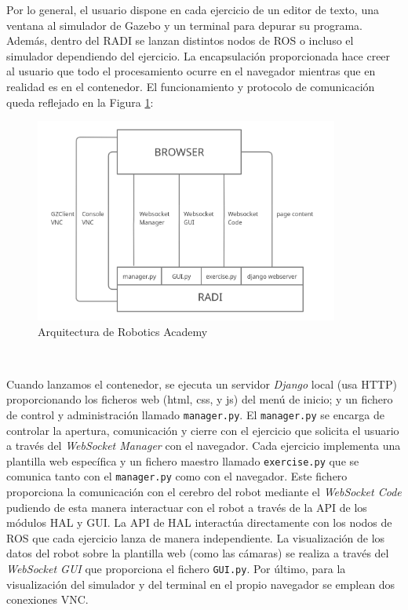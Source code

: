 Por lo general, el usuario dispone en cada ejercicio de un editor de texto, una ventana al simulador de Gazebo y un terminal para depurar su programa. Además, dentro del RADI se lanzan distintos nodos de ROS o incluso el simulador dependiendo del ejercicio. La encapsulación proporcionada hace creer al usuario que todo el procesamiento ocurre en el navegador mientras que en realidad es en el contenedor. El funcionamiento y protocolo de comunicación queda reflejado en la Figura \ref{fig:arquitectura_robotics_academy}:\\

\begin{figure} [H]
  \begin{center}
    \includegraphics[width=10cm]{imagenes/cap3/robotics_academy_architecture.png}
  \end{center}
  \caption{Arquitectura de Robotics Academy}
  \label{fig:arquitectura_robotics_academy}
\end{figure}\

Cuando lanzamos el contenedor, se ejecuta un servidor \textit{Django} local (usa HTTP) proporcionando los ficheros web (html, css, y js) del menú de inicio; y un fichero de control y administración llamado \texttt{manager.py}. El \texttt{manager.py} se encarga de controlar la apertura, comunicación y cierre con el ejercicio que solicita el usuario a través del \textit{WebSocket Manager} con el navegador. Cada ejercicio implementa una plantilla web específica y un fichero maestro llamado \texttt{exercise.py} que se comunica tanto con el \texttt{manager.py} como con el navegador. Este fichero proporciona la comunicación con el cerebro del robot mediante el \textit{WebSocket Code} pudiendo de esta manera interactuar con el robot a través de la API de los módulos HAL y GUI. La API de HAL interactúa directamente con los nodos de ROS que cada ejercicio lanza de manera independiente. La visualización de los datos del robot sobre la plantilla web (como las cámaras) se realiza a través del \textit{WebSocket GUI} que proporciona el fichero \texttt{GUI.py}. Por último, para la visualización del simulador y del terminal en el propio navegador se emplean dos conexiones VNC.\\

